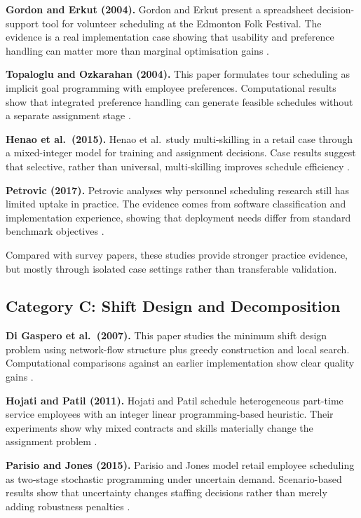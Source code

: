\documentclass[12pt]{article}
\begin{document}
\textbf{Gordon and Erkut (2004).} Gordon and Erkut present a spreadsheet decision-support tool for volunteer scheduling at the Edmonton Folk Festival. The evidence is a real implementation case showing that usability and preference handling can matter more than marginal optimisation gains \cite{gordon2004}.

\textbf{Topaloglu and Ozkarahan (2004).} This paper formulates tour scheduling as implicit goal programming with employee preferences. Computational results show that integrated preference handling can generate feasible schedules without a separate assignment stage \cite{topaloglu2004}.

\textbf{Henao et al.\ (2015).} Henao et al.\ study multi-skilling in a retail case through a mixed-integer model for training and assignment decisions. Case results suggest that selective, rather than universal, multi-skilling improves schedule efficiency \cite{henao2015}.

\textbf{Petrovic (2017).} Petrovic analyses why personnel scheduling research still has limited uptake in practice. The evidence comes from software classification and implementation experience, showing that deployment needs differ from standard benchmark objectives \cite{petrovic2017}.

Compared with survey papers, these studies provide stronger practice evidence, but mostly through isolated case settings rather than transferable validation.

\subsection{Category C: Shift Design and Decomposition}

\textbf{Di Gaspero et al.\ (2007).} This paper studies the minimum shift design problem using network-flow structure plus greedy construction and local search. Computational comparisons against an earlier implementation show clear quality gains \cite{digaspero2007}.

\textbf{Hojati and Patil (2011).} Hojati and Patil schedule heterogeneous part-time service employees with an integer linear programming-based heuristic. Their experiments show why mixed contracts and skills materially change the assignment problem \cite{hojati2011}.

\textbf{Parisio and Jones (2015).} Parisio and Jones model retail employee scheduling as two-stage stochastic programming under uncertain demand. Scenario-based results show that uncertainty changes staffing decisions rather than merely adding robustness penalties \cite{parisio2015}.
\end{document}
